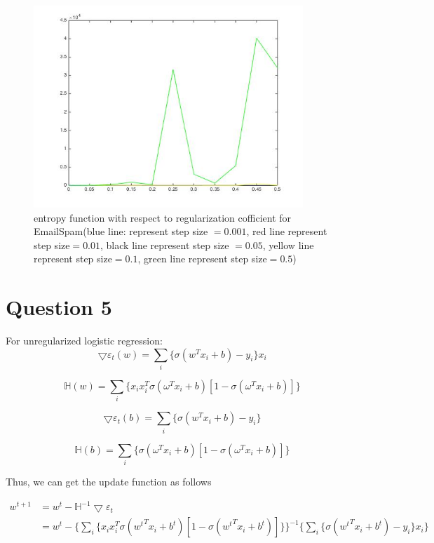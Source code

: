 \documentclass[11pt]{article}
\numberwithin{equation}{section}
\begin{document}
	\begin{figure} [H] 
	\centering
    	\includegraphics[width=4in]{Q5_3} 
    	\caption{entropy function with respect to regularization cofficient for EmailSpam(blue line: represent step size $=  0.001$, red line represent step size$ = 0.01$, black line represent step size $= 0.05$, yellow line represent step size$ = 0.1$, green line represent step size$ = 0.5$)} 
    	\label{fig:side:a} 
	\end{figure}

\section{Question 5}
	For unregularized logistic regression:
	\begin{equation}
	\bigtriangledown{\varepsilon_t(w)} =  \sum_i \{\sigma({w}^Tx_i + b) - y_i\}x_i
	\end{equation}
	
	\begin{equation}
	\mathbb{H}(w) = \sum_i{\{x_ix_i^T\sigma(\omega^Tx_i+b)[1 - \sigma(\omega^Tx_i+b)]\}}
	\end{equation}
	
	\begin{equation}
	\bigtriangledown{\varepsilon_t(b)} =  \sum_i \{\sigma({w}^Tx_i + b) - y_i\}
	\end{equation}
	
	\begin{equation}
	\mathbb{H}(b) = \sum_i{\{\sigma(\omega^Tx_i+b)[1 - \sigma(\omega^Tx_i+b)]\}}
	\end{equation}
	
	Thus, we can get the update function as follows
	
	\begin{equation}
	\begin{split}
	w^{t+1} &= w^t - \mathbb{H}^{-1}\bigtriangledown{\varepsilon_t} \\
	&= w^t - \{\sum_i{\{x_ix_i^T\sigma({w^t}^Tx_i+b^t)[1 - \sigma({w^t}^Tx_i+b^t)]\}}\}^{-1}\{\sum_i \{\sigma({w^t}^Tx_i + b^t) - y_i\}x_i\}
	\end{split}
	\end{equation}
	
\end{document}
